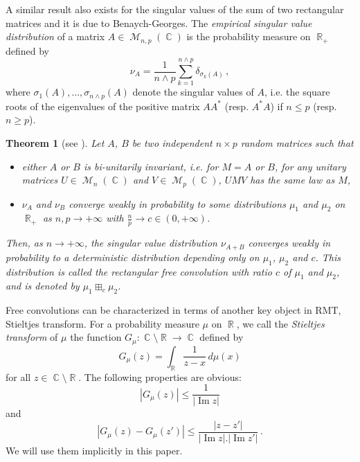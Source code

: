 \documentclass[11pt,a4paper]{article}
\DeclareMathOperator{\R}{\mathbb{R}}
\DeclareMathOperator{\C}{\mathbb{C}}
\DeclareMathOperator{\MM}{\mathcal{M}}
\DeclareMathOperator{\1}{\mathbf{1}}
\DeclareMathOperator{\Imag}{\mathrm{Im}}
\newtheorem{Theorem}[Proposition]{Theorem}
\theoremstyle{definition}
\begin{document}
A similar result also exists for the singular values of the sum of two rectangular matrices and it is due to Benaych-Georges. The \emph{empirical singular value distribution} of a matrix $A \in \MM_{n,p}(\C)$ is the probability measure on $\R_+$ defined by
\begin{displaymath}
\nu_A = \frac{1}{n \wedge p} \sum_{k=1}^{n \wedge p} \delta_{\sigma_k(A)} \, ,
\end{displaymath}
where $\sigma_1(A),\ldots,\sigma_{n \wedge p}(A)$ denote the singular values of $A$, i.e. the square roots of the eigenvalues of the positive matrix $AA^*$ (resp. $A^*A$) if $n \le p$ (resp. $n \ge p$).

\begin{Theorem}[see {\cite[Theorem 3.13]{BG}}]
Let $A$, $B$ be two independent $n \times p$ random matrices such that
\begin{itemize}
\item either $A$ or $B$ is bi-unitarily invariant, i.e. for $M = A$ or $B$, for any unitary matrices $U \in \MM_n(\C)$ and $V \in \MM_p(\C)$, $UMV$ has the same law as $M$,
\item $\nu_A$ and $\nu_B$ converge weakly in probability to some distributions $\mu_1$ and $\mu_2$ on $\R_+$ as $n,p \to +\infty$ with $\frac{n}{p} \to c \in (0,+\infty)$.
\end{itemize}
Then, as $n \to +\infty$, the singular value distribution $\nu_{A+B}$ converges weakly in probability to a deterministic distribution depending only on $\mu_1$, $\mu_2$ and $c$. This distribution is called the \emph{rectangular free convolution} with ratio $c$ of $\mu_1$ and $\mu_2$, and is denoted by $\mu_1 \boxplus_c \mu_2$.
\end{Theorem}

Free convolutions can be characterized in terms of another key object in RMT, Stieltjes transform. For a probability measure $\mu$ on $\R$, we call the \emph{Stieltjes transform} of $\mu$ the function $G_{\mu} : \C \setminus \R \to \C$ defined by
\begin{displaymath}
G_{\mu}(z) = \int_{\R} \frac{1}{z-x} \, d\mu(x)
\end{displaymath}
for all $z \in \C \setminus \R$. The following properties are obvious:
\begin{displaymath}
|G_{\mu}(z)| \le \frac{1}{|\Imag z|}
\end{displaymath}
and
\begin{displaymath}
|G_{\mu}(z) - G_{\mu}(z')| \le \frac{|z-z'|}{|\Imag z|.|\Imag z'|} \, .
\end{displaymath}
We will use them implicitly in this paper.
\end{document}
